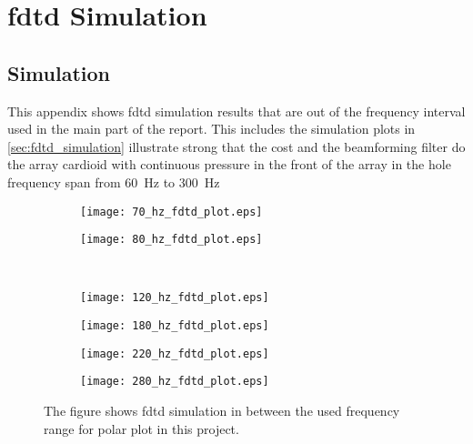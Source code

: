 \chapter{\gls{fdtd} Simulation}\label{ap:fdtd_in_between}

\section{Simulation}
This appendix shows \gls{fdtd} simulation results that are out of the frequency interval used in the main part of the report. This includes the simulation plots in \autoref{sec:fdtd_simulation} illustrate strong that the cost and the beamforming filter do the array cardioid with continuous pressure in the front of the array in the hole frequency span from \SI{60}{\hertz} to \SI{300}{\hertz}



\begin{figure}[H]
\begin{subfigure}[c]{0.5\textwidth}
\texttt{[image: 70\_hz\_fdtd\_plot.eps]}
\label{fig:ap:fdtd_70_hz}
\end{subfigure}
\begin{subfigure}[c]{0.5\textwidth}
\texttt{[image: 80\_hz\_fdtd\_plot.eps]}
\label{fig:ap:fdtd_80_hz}
\end{subfigure}\\
\hspace{0.1\textheight}
\begin{subfigure}[c]{0.5\textwidth}
\texttt{[image: 120\_hz\_fdtd\_plot.eps]}
\label{fig:ap:fdtd_120_hz}
\end{subfigure}
\begin{subfigure}[c]{0.5\textwidth}
\texttt{[image: 180\_hz\_fdtd\_plot.eps]}
\label{fig:ap:fdtd_180_hz}
\end{subfigure}
\begin{subfigure}[c]{0.5\textwidth}
\texttt{[image: 220\_hz\_fdtd\_plot.eps]}
\label{fig:ap:fdtd_220_hz}
\end{subfigure}
\begin{subfigure}[c]{0.5\textwidth}
\texttt{[image: 280\_hz\_fdtd\_plot.eps]}
\label{fig:ap:fdtd_280_hz}
\end{subfigure}
\caption{The figure shows \gls{fdtd} simulation in between the used frequency range for polar plot in this project.}
		\label{fig:ap:fdtd_between}
\end{figure}

